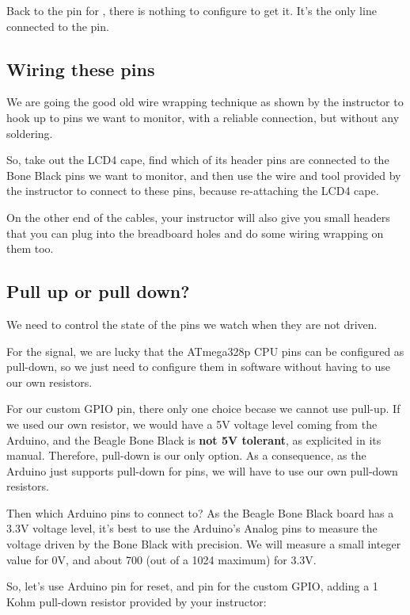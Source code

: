 Back to the pin for , there is nothing to configure to
get it. It's the only line connected to the pin.

\subsection{Wiring these pins}

We are going the good old wire wrapping technique as shown by the
instructor to hook up to pins we want to monitor, with a reliable
connection, but without any soldering.

So, take out the LCD4 cape, find which of its header pins are connected
to the Bone Black pins we want to monitor, and then use the wire and
tool provided by the instructor to connect to these pins, because
re-attaching the LCD4 cape.

On the other end of the cables, your instructor will also give you small
headers that you can plug into the breadboard holes and do some wiring
wrapping on them too.

\subsection{Pull up or pull down?}

We need to control the state of the pins we watch when they are not
driven.

For the  signal, we are lucky that the ATmega328p CPU
pins can be configured as pull-down, so we just need to configure them
in software without having to use our own resistors.

For our custom GPIO pin, there only one choice becase we cannot use
pull-up. If we used our own resistor, we would have a 5V voltage level
coming from the Arduino, and the Beagle Bone Black is {\bf not 5V
tolerant}, as explicited in its manual. Therefore, pull-down is our only
option. As a consequence, as the Arduino just supports pull-down for
pins, we will have to use our own pull-down resistors.

Then which Arduino pins to connect to? As the Beagle Bone Black board
has a 3.3V voltage level, it's best to use the Arduino's Analog pins to
measure the voltage driven by the Bone Black with precision. We will measure a
small integer value for 0V, and about 700 (out of a 1024 maximum) for
3.3V.

So, let's use Arduino pin  for reset, and pin  for the
custom GPIO, adding a 1 Kohm pull-down resistor provided by your
instructor:

